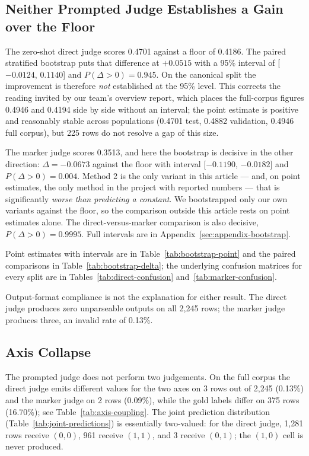 \documentclass{zapiski}
\begin{document}
\subsection{Neither Prompted Judge Establishes a Gain over the Floor}
\label{sec:results-zeroshot}

The zero-shot direct judge scores 0.4701 against a floor of 0.4186. The
paired stratified bootstrap puts that difference at $+0.0515$ with a 95\%
interval of [$-0.0124$, $0.1140$] and $P(\Delta>0)=0.945$. On the canonical
split the improvement is therefore \emph{not} established at the 95\% level.
This corrects the reading invited by our team's overview report, which places
the full-corpus figures 0.4946 and 0.4194 side by side without an interval;
the point estimate is positive and reasonably stable across populations
(0.4701 test, 0.4882 validation, 0.4946 full corpus), but 225 rows do not
resolve a gap of this size.

The marker judge scores 0.3513, and here the bootstrap is decisive in the
other direction: $\Delta=-0.0673$ against the floor with interval
[$-0.1190$, $-0.0182$] and $P(\Delta>0)=0.004$. Method 2 is the only variant
in this article --- and, on point estimates, the only method in the project
with reported numbers --- that is significantly \emph{worse than predicting a
constant}. We bootstrapped only our own variants against the floor, so the
comparison outside this article rests on point estimates alone.
The direct-versus-marker comparison is also decisive,
$P(\Delta>0)=0.9995$. Full intervals are in
Appendix~\ref{sec:appendix-bootstrap}.

Point estimates with intervals are in Table~\ref{tab:bootstrap-point} and the
paired comparisons in Table~\ref{tab:bootstrap-delta}; the underlying
confusion matrices for every split are in Tables~\ref{tab:direct-confusion}
and~\ref{tab:marker-confusion}.

Output-format compliance is not the explanation for either result. The direct
judge produces zero unparseable outputs on all 2,245 rows; the marker judge
produces three, an invalid rate of 0.13\%.

\subsection{Axis Collapse}
\label{sec:results-collapse}

The prompted judge does not perform two judgements. On the full corpus the
direct judge emits different values for the two axes on 3 rows out of 2,245
(0.13\%) and the marker judge on 2 rows (0.09\%), while the gold labels differ
on 375 rows (16.70\%); see Table~\ref{tab:axis-coupling}. The joint prediction
distribution (Table~\ref{tab:joint-predictions}) is essentially two-valued:
for the direct judge, 1,281 rows receive $(0,0)$, 961 receive $(1,1)$, and 3
receive $(0,1)$; the $(1,0)$ cell is never produced.
\end{document}
